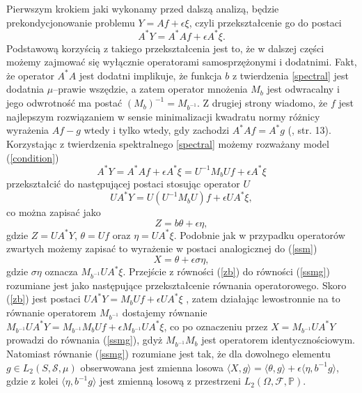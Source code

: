 \documentclass[man,mfiu]{mgrwms}
\begin{document}
\indent Pierwszym krokiem jaki wykonamy przed dalszą analizą, będzie prekondycjonowanie problemu $Y=Af+\epsilon \xi$, czyli przekształcenie go do postaci 
\begin{equation}\label{condition}
A^*Y=A^*Af+\epsilon A^*\xi.
\end{equation} 
Podstawową korzyścią z takiego przekształcenia jest to, że w dalszej części możemy zajmować się wyłącznie operatorami samosprzężonymi i dodatnimi. Fakt, że operator $A^*A$ jest dodatni implikuje, że funkcja $b$ z twierdzenia \ref{spectral} jest dodatnia $\mu$--prawie wszędzie, a zatem operator mnożenia $M_b$ jest odwracalny i jego odwrotność ma postać $(M_b)^{-1}=M_{b^{-1}}$. Z drugiej strony wiadomo, że $f$ jest najlepszym rozwiązaniem w sensie minimalizacji kwadratu normy różnicy wyrażenia $Af-g$ wtedy i tylko wtedy, gdy zachodzi $A^*Af=A^*g$ (\cite{iphde}, str. 13).\\
\indent Korzystając z twierdzenia spektralnego \ref{spectral} możemy rozważany model (\ref{condition})
\begin{displaymath}
A^*Y=A^*Af+\epsilon A^*\xi=U^{-1}M_bUf+\epsilon A^* \xi
\end{displaymath} przekształcić do następującej postaci stosując operator $U$
\begin{displaymath}
UA^*Y=U(U^{-1}M_bU)f+\epsilon UA^*\xi,
\end{displaymath}
co można zapisać jako
\begin{equation}\label{zb}
Z=b\theta+\epsilon \eta,
\end{equation}
gdzie $Z=UA^*Y$, $\theta =Uf$ oraz $\eta =UA^*\xi$. Podobnie jak w przypadku operatorów zwartych możemy zapisać to wyrażenie w postaci analogicznej do (\ref{ssm})
\begin{equation}\label{ssmg}
X=\theta +\epsilon\sigma\eta,
\end{equation}
gdzie $\sigma\eta$ oznacza $M_{b^{-1}}UA^*\xi$. Przejście z równości (\ref{zb}) do równości (\ref{ssmg}) rozumiane jest jako następujące przekształcenie równania operatorowego. Skoro (\ref{zb}) jest postaci $UA^*Y=M_bUf+\epsilon UA^*\xi$ , zatem działając lewostronnie na to równanie operatorem $M_{b^{-1}}$ dostajemy równanie $M_{b^{-1}}UA^*Y=M_{b^{-1}}M_bUf+\epsilon M_{b^{-1}}UA^*\xi$, co po oznaczeniu przez $X=M_{b^{-1}}UA^*Y$ prowadzi do równania (\ref{ssmg}), gdyż $M_{b^{-1}}M_b$ jest operatorem identycznościowym. Natomiast równanie (\ref{ssmg}) rozumiane jest tak, że dla dowolnego elementu $g\in L_2(S,\mathcal{S},\mu )$ obserwowana jest zmienna losowa $\langle X,g\rangle = \langle \theta,g\rangle +\epsilon \langle \eta, b^{-1}g\rangle$, gdzie z kolei $\langle \eta,  b^{-1}g\rangle$ jest zmienną losową z przestrzeni $L_2(\Omega,\mathcal{F},\mathbb{P})$.\\
\end{document}
